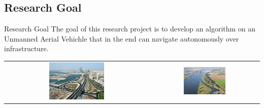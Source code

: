 \documentclass{beamer}
\begin{document}
\subsection{Research Goal}
\begin{frame}
\begin{block}{Research Goal}
The goal of this research project is to develop an algorithm on an Unmanned Aerial Vehichle that in the end can navigate autonomously over infrastructure.
\end{block}
\begin{center}
\begin{tabular}{ c c }
\includegraphics[width = 0.4\textwidth]{lucht_weg.jpg} & \includegraphics[width = 0.4\textwidth]{lucht_rivier.jpg}
\end{tabular}
\end{center}
\end{frame}
\end{document}
